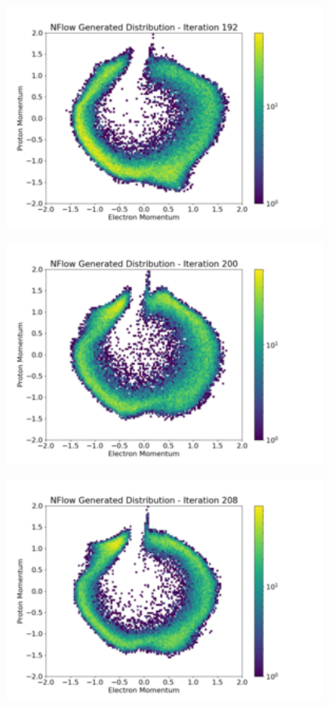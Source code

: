 \documentclass[aspectratio=169]{beamer}
\begin{document}
\begin{frame}[noframenumbering]\centering\includegraphics[width=0.8\textwidth]{images/400training/400training-24.png}\end{frame}
\begin{frame}[noframenumbering]\centering\includegraphics[width=0.8\textwidth]{images/400training/400training-25.png}\end{frame}
\begin{frame}[noframenumbering]\centering\includegraphics[width=0.8\textwidth]{images/400training/400training-26.png}\end{frame}
\end{document}
